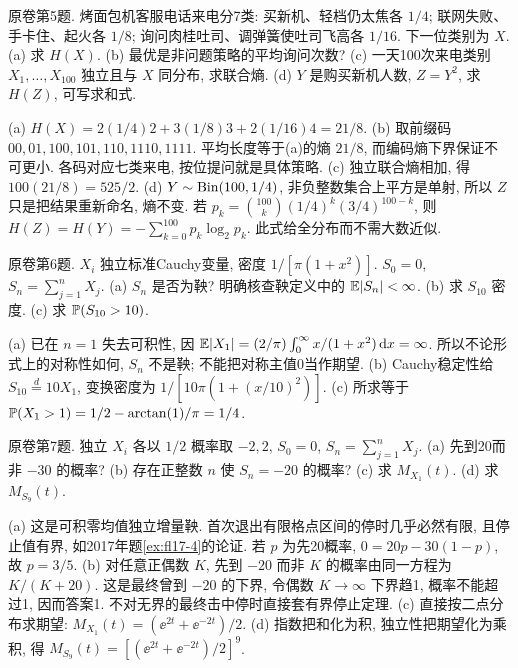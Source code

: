 \begin{exercise}\label{ex:fl18-5}
原卷第5题. 烤面包机客服电话来电分7类: 买新机、轻档仍太焦各 $1/4$; 联网失败、手卡住、起火各 $1/8$; 询问肉桂吐司、调弹簧使吐司飞高各 $1/16$. 下一位类别为 $X$. (a) 求 $H(X)$. (b) 最优是非问题策略的平均询问次数? (c) 一天100次来电类别 $X_1,\ldots,X_{100}$ 独立且与 $X$ 同分布, 求联合熵. (d) $Y$ 是购买新机人数, $Z=Y^2$, 求 $H(Z)$, 可写求和式.
\end{exercise}
\begin{solution}
(a)\label{sol:fl18-5-a} $H(X)=2(1/4)2+3(1/8)3+2(1/16)4=21/8$.
(b)\label{sol:fl18-5-b} 取前缀码 $00,01,100,101,110,1110,1111$. 平均长度等于(a)的熵 $21/8$, 而编码熵下界保证不可更小. 各码对应七类来电, 按位提问就是具体策略.
(c)\label{sol:fl18-5-c} 独立联合熵相加, 得 $100(21/8)=525/2$.
(d)\label{sol:fl18-5-d} $Y\sim\operatorname{Bin}(100,1/4)$, 非负整数集合上平方是单射, 所以 $Z$ 只是把结果重新命名, 熵不变. 若 $p_k=\binom{100}k(1/4)^k(3/4)^{100-k}$, 则 $H(Z)=H(Y)=-\sum_{k=0}^{100}p_k\log_2p_k$. 此式给全分布而不需大数近似.
\end{solution}

\begin{exercise}\label{ex:fl18-6}
原卷第6题. $X_i$ 独立标准Cauchy变量, 密度 $1/[\pi(1+x^2)]$. $S_0=0$, $S_n=\sum_{j=1}^nX_j$. (a) $S_n$ 是否为鞅? 明确核查鞅定义中的 $\mathbb E|S_n|<\infty$. (b) 求 $S_{10}$ 密度. (c) 求 $\mathbb P(S_{10}>10)$.
\end{exercise}
\begin{solution}
(a)\label{sol:fl18-6-a} 已在 $n=1$ 失去可积性, 因 $\mathbb E|X_1|=(2/\pi)\int_0^\infty x/(1+x^2)\,\mathrm d x=\infty$. 所以不论形式上的对称性如何, $S_n$ 不是鞅; 不能把对称主值0当作期望.
(b)\label{sol:fl18-6-b} Cauchy稳定性给 $S_{10}\overset d=10X_1$, 变换密度为 $1/[10\pi(1+(x/10)^2)]$.
(c)\label{sol:fl18-6-c} 所求等于 $\mathbb P(X_1>1)=1/2-\arctan(1)/\pi=1/4$.
\end{solution}

\begin{exercise}\label{ex:fl18-7}
原卷第7题. 独立 $X_i$ 各以 $1/2$ 概率取 $-2,2$, $S_0=0$, $S_n=\sum_{j=1}^nX_j$. (a) 先到20而非 $-30$ 的概率? (b) 存在正整数 $n$ 使 $S_n=-20$ 的概率? (c) 求 $M_{X_1}(t)$. (d) 求 $M_{S_9}(t)$.
\end{exercise}
\begin{solution}
(a)\label{sol:fl18-7-a} 这是可积零均值独立增量鞅. 首次退出有限格点区间的停时几乎必然有限, 且停止值有界, 如2017年题\ref{ex:fl17-4}的论证. 若 $p$ 为先20概率, $0=20p-30(1-p)$, 故 $p=3/5$.
(b)\label{sol:fl18-7-b} 对任意正偶数 $K$, 先到 $-20$ 而非 $K$ 的概率由同一方程为 $K/(K+20)$. 这是最终曾到 $-20$ 的下界, 令偶数 $K\to\infty$ 下界趋1, 概率不能超过1, 因而答案1. 不对无界的最终击中停时直接套有界停止定理.
(c)\label{sol:fl18-7-c} 直接按二点分布求期望: $M_{X_1}(t)=(\ee^{2t}+\ee^{-2t})/2$.
(d)\label{sol:fl18-7-d} 指数把和化为积, 独立性把期望化为乘积, 得 $M_{S_9}(t)=[(\ee^{2t}+\ee^{-2t})/2]^9$.
\end{solution}

